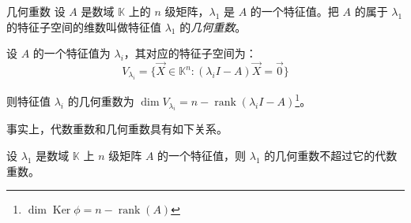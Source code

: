 \begin{definition}{几何重数}
	设 $A$ 是数域 $\mathbb K$ 上的 $n$ 级矩阵，$\lambda_1$ 是 $A$ 的一个特征值。把 $A$ 的属于 $\lambda_1$ 的特征子空间的维数叫做特征值 $\lambda_1$ 的\emph{几何重数}。
\end{definition}

设 $A$ 的一个特征值为 $\lambda_i$，其对应的特征子空间为：
$$
V_{\lambda_i} = \{\vec X \in \mathbb K^n \colon (\lambda_i I - A) \vec X = \vec 0\}
$$

则特征值 $\lambda_i$ 的几何重数为 $\dim V_{\lambda_i} = n - \operatorname{rank}(\lambda_i I -A)$\footnote{$\dim \operatorname{Ker} \phi = n - \operatorname{rank}(A)$}。

事实上，代数重数和几何重数具有如下关系。

\begin{theorem}
	设 $\lambda_1$ 是数域 $\mathbb K$ 上 $n$ 级矩阵 $A$ 的一个特征值，则 $\lambda_1$ 的几何重数不超过它的代数重数。
\end{theorem}


